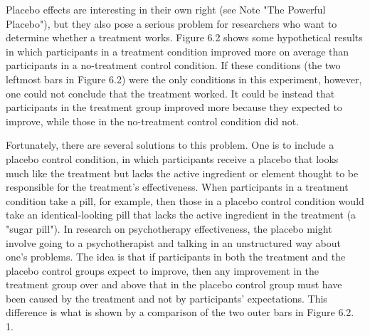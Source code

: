Placebo effects are interesting in their own right (see Note "The Powerful Placebo"), but they also pose a serious problem for researchers who want to determine whether a treatment works. Figure 6.2 shows some hypothetical results in which participants in a treatment condition improved more on average than participants in a no-treatment control condition. If these conditions (the two leftmost bars in Figure 6.2) were the only conditions in this experiment, however, one could not conclude that the treatment worked. It could be instead that participants in the treatment group improved more because they expected to improve, while those in the no-treatment control condition did not.

Fortunately, there are several solutions to this problem. One is to include a placebo control condition, in which participants receive a placebo that looks much like the treatment but lacks the active ingredient or element thought to be responsible for the treatment's effectiveness. When participants in a treatment condition take a pill, for example, then those in a placebo control condition would take an identical-looking pill that lacks the active ingredient in the treatment (a "sugar pill"). In research on psychotherapy effectiveness, the placebo might involve going to a psychotherapist and talking in an unstructured way about one's problems. The idea is that if participants in both the treatment and the placebo control groups expect to improve, then any improvement in the treatment group over and above that in the placebo control group must have been caused by the treatment and not by participants' expectations. This difference is what is shown by a comparison of the two outer bars in Figure 6.2.
1. 

